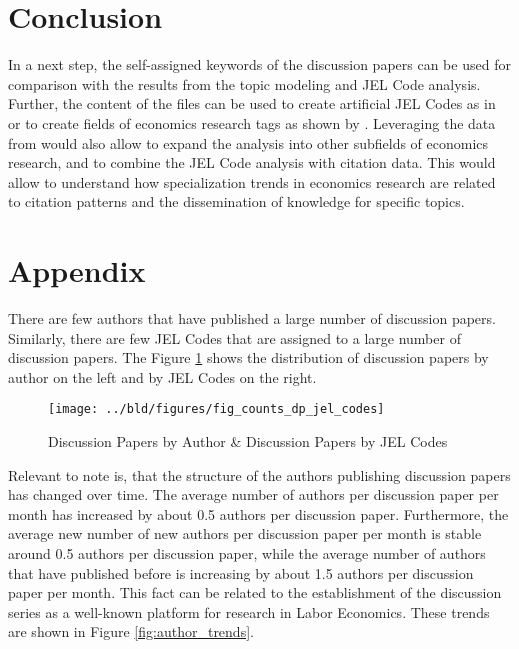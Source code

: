 \documentclass[11pt, a4paper, leqno]{article}
\begin{document}
\section{Conclusion}
In a next step, the self-assigned keywords of the discussion papers can be used for comparison with the results from the topic modeling and JEL Code analysis.
Further, the content of the files can be used to create artificial JEL Codes as in \citet{heikkila2024} or to create fields of economics research tags as shown by \citet{anauati2016, galiani2023a}.
Leveraging the data from \citet{anauati2016, galiani2023a} would also allow to expand the analysis into other subfields of economics research, and to combine the JEL Code analysis with citation data.
This would allow to understand how specialization trends in economics research are related to citation patterns and the dissemination of knowledge for specific topics.

\printbibliography

\clearpage

\section{Appendix}

There are few authors that have published a large number of discussion papers.
Similarly, there are few JEL Codes that are assigned to a large number of discussion papers.
The Figure \ref{fig:counts_dp_jel_codes} shows the distribution of discussion papers by author on the left and by JEL Codes on the right.

\begin{figure}
    \centering
    \texttt{[image: ../bld/figures/fig\_counts\_dp\_jel\_codes]}
    \caption{Discussion Papers by Author \& Discussion Papers by JEL Codes}
    \label{fig:counts_dp_jel_codes}
\end{figure}

Relevant to note is, that the structure of the authors publishing discussion papers has changed over time.
The average number of authors per discussion paper per month has increased by about 0.5 authors per discussion paper.
Furthermore, the average new number of new authors per discussion paper per month is stable around 0.5 authors per discussion paper, while the average number of authors that have published before is increasing by about 1.5 authors per discussion paper per month.
This fact can be related to the establishment of the discussion series as a well-known platform for research in Labor Economics.
These trends are shown in Figure \ref{fig:author_trends}.
\end{document}
